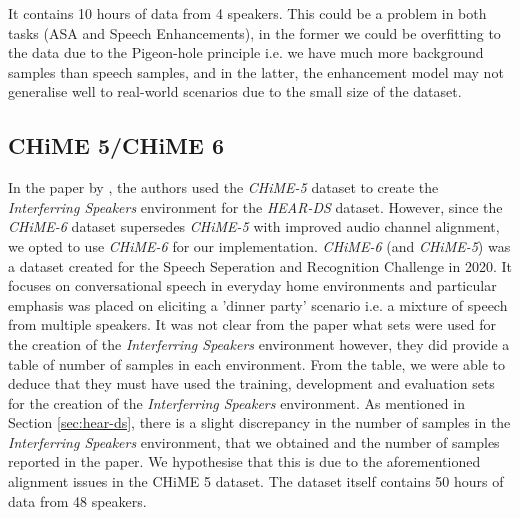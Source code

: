 \documentclass[logo,bsc,singlespacing,parskip,online]{infthesis}
\newcommand{\heards}{\textit{HEAR-DS}\xspace}
\newcommand{\chime}[1]{\textit{CHiME-#1}\xspace}
\begin{document}
It contains 10 hours of data from 4 speakers. This could be a problem in both tasks (ASA and Speech Enhancements), in the former
we could be overfitting to the data due to the Pigeon-hole principle i.e. we have much more background samples than speech samples, 
and in the latter, the enhancement model may not generalise well to real-world scenarios due to the small size of the dataset. 


\subsection{CHiME 5/CHiME 6}
In the paper by \citet{Huwel2020HearDS}, the authors used the \chime{5} dataset to create the \textit{Interferring Speakers} environment for the \heards dataset.
However, since the \chime{6} dataset supersedes \chime{5} with improved audio channel alignment, we opted to use \chime{6} for our implementation.
\chime{6} (and \chime{5}) was a dataset created for the Speech Seperation and Recognition Challenge in 2020. It 
focuses on conversational speech in everyday home environments and particular emphasis was placed on 
eliciting a 'dinner party' scenario i.e. a mixture of speech from multiple speakers. It was not 
clear from the paper what sets were used for the creation of the \textit{Interferring Speakers} environment 
however, they did provide a table of number of samples in each environment. From the table, we 
were able to deduce that they must have used the training, development and evaluation sets for the creation of the \textit{Interferring Speakers} environment.
As mentioned in Section \ref{sec:hear-ds}, there is a slight discrepancy in the number of samples in the \textit{Interferring Speakers} environment, 
that we obtained and the number of samples reported in the paper. We hypothesise that this is due to the aforementioned alignment issues in the CHiME 5 dataset.
The dataset itself contains 50 hours of data from 48 speakers.
\end{document}
